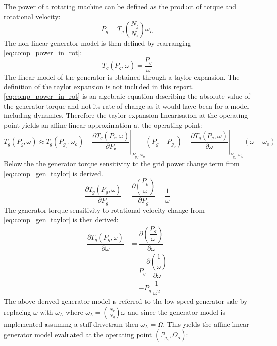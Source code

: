 The power of a rotating machine can be defined as the product of torque and rotational velocity:
\begin{equation}\label{eq:comp_power_in_rot}
	P_{g} = T_g \left( \dfrac{N_g}{N_r} \right)\omega_L
\end{equation}
The non linear generator model is then defined by rearranging \cref{eq:comp_power_in_rot}:
\begin{equation}\label{eq:comp_gen_torque}
	T_g(P_g, \omega) = \dfrac{P_g}{\omega}
\end{equation}
The linear model of the generator is obtained through a taylor expansion. The definition of the taylor expansion is not included in this report. \cref{eq:comp_power_in_rot} is an algebraic equation describing the absolute value of the generator torque and not its rate of change as it would have been for a model including dynamics. Therefore the taylor expansion linearisation at the operating point yields an affine linear approximation at the operating point:
\begin{equation}\label{eq:comp_gen_taylor}
	T_g( P_g, \omega) \approx T_g(P_{g_o}, \omega_o) + 
	\left. \dfrac{\partial T_g( P_g, \omega)}{\partial P_g} \right |_{P_{g_o},\omega_o} ( P_g-P_{g_o}) + 
	\left. \dfrac{\partial T_g( P_g, \omega)}{\partial \omega} \right |_{P_{g_o},\omega_o} (\omega - \omega_o)
\end{equation}
Below the the generator torque sensitivity to the grid power change term from \cref{eq:comp_gen_taylor} is derived.
\begin{equation} 
	\dfrac{\partial T_g( P_g, \omega)}{\partial P_g} = \dfrac{\partial \left (\dfrac{P_g}{\omega}\right )}{\partial P_g} \label{eq:comp_gen_1} = \dfrac{1}{\omega}
\end{equation}
The generator torque sensitivity to rotational velocity change from \cref{eq:comp_gen_taylor} is then derived:
\begin{align}
	\dfrac{\partial T_g(P_g, \omega)}{\partial \omega} & = \dfrac{\partial \left (\dfrac{P_g}{\omega}\right )}{\partial \omega} \\
	& = P_g \dfrac{\partial \left (\dfrac{1}{\omega}\right )}{\partial \omega} \\
	& = -P_g \, \dfrac{1}{\omega^2}
\end{align}
The above derived generator model is referred to the low-speed generator side by replacing $ \omega $ with $ \omega_L $ where $ \omega_L = \left (\frac{N_r}{N_g} \right ) \omega $ and since the generator model is implemented assuming a stiff drivetrain then $ \omega_L = \Omega $. This yields the affine linear generator model evaluated at the operating point $ (P_{g_o}, \Omega_o) $:
